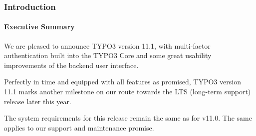 %

\begin{frame}[fragile]
	\frametitle{Introduction}
	\framesubtitle{Executive Summary}

	\small
		We are pleased to announce TYPO3 version 11.1, with multi-factor
		authentication built into the TYPO3 Core and some great usability
		improvements of the backend user interface.

		\vspace{0.2cm}

		Perfectly in time and equipped with all features as promised, TYPO3
		version 11.1 marks another milestone on our route towards the LTS
		(long-term support) release later this year.

		\vspace{0.2cm}

		The system requirements for this release remain the same as for v11.0.
		The same applies to our support and maintenance promise.

	\normalsize

\end{frame}

